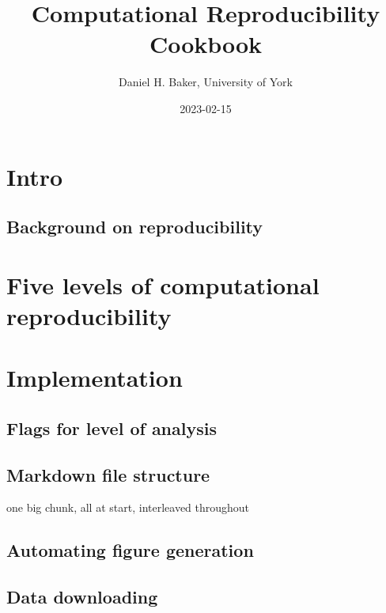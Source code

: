 \documentclass[
]{article}
\title{Computational Reproducibility Cookbook}
\author{Daniel H. Baker, University of York}
\date{2023-02-15}
\begin{document}
\maketitle

\hypertarget{intro}{%
\section{Intro}\label{intro}}

\hypertarget{background-on-reproducibility}{%
\subsection{Background on reproducibility}\label{background-on-reproducibility}}

\hypertarget{five-levels-of-computational-reproducibility}{%
\section{Five levels of computational reproducibility}\label{five-levels-of-computational-reproducibility}}

\hypertarget{implementation}{%
\section{Implementation}\label{implementation}}

\hypertarget{flags-for-level-of-analysis}{%
\subsection{Flags for level of analysis}\label{flags-for-level-of-analysis}}

\hypertarget{markdown-file-structure}{%
\subsection{Markdown file structure}\label{markdown-file-structure}}

one big chunk, all at start, interleaved throughout

\hypertarget{automating-figure-generation}{%
\subsection{Automating figure generation}\label{automating-figure-generation}}

\hypertarget{data-downloading}{%
\subsection{Data downloading}\label{data-downloading}}
\end{document}
